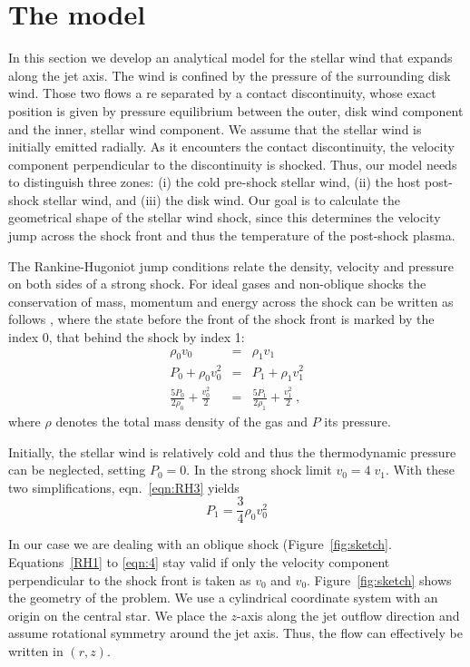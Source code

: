 \section{The model}

In this section we develop an analytical model for the stellar wind that expands along the jet axis. The wind is confined by the pressure of the surrounding disk wind. Those two flows a re separated by a contact discontinuity, whose exact position is given by pressure equilibrium between the outer, disk wind component and the inner, stellar wind component. We assume that the stellar wind is initially emitted radially. As it encounters the contact discontinuity, the velocity component perpendicular to the discontinuity is shocked. Thus, our model needs to distinguish three zones: (i) the cold pre-shock stellar wind, (ii) the host post-shock stellar wind, and (iii) the disk wind. Our goal is to calculate the geometrical shape of the stellar wind shock, since this determines the velocity jump across the shock front and thus the temperature of the post-shock plasma.

The Rankine-Hugoniot jump conditions relate the density, velocity and pressure on both sides of a strong shock. For ideal gases and non-oblique shocks the conservation of mass, momentum and energy across the shock can be written as follows \citep[][chap.~7, \S~15]{http://adsabs.harvard.edu/abs/1967pswh.book.....Z}, where the state before the front of the shock front is marked by the index 0, that behind the shock by index 1:
\begin{eqnarray}
\rho_0 v_0 &=& \rho_1 v_1 \label{eqn:RH1}\\
P_0+\rho_0 v_0^2 &=& P_1+\rho_1 v_1^2 \label{eqn:RH2}\\
\frac{5 P_0}{2\rho_0}+\frac{v_0^2}{2}&=&\frac{5 P_1}{2\rho_1}+\frac{v_1^2}{2} \ ,\label{eqNRH3}
\end{eqnarray}
where $\rho$ denotes the total mass density of the gas and $P$ its pressure. 

Initially, the stellar wind is relatively cold and thus the thermodynamic pressure can be neglected, setting $P_0=0$. In the strong shock limit $v_0=4\;v_1$. With these two simplifications, eqn.~\ref{eqn:RH3} yields
\begin{equation}
P_1 = \frac{3}{4} \rho_0 v_0^2 \label{eqn:4}
\end{equation}

In our case we are dealing with an oblique shock (Figure~\ref{fig:sketch}. Equations~\ref{RH1} to \ref{eqn:4} stay valid if only the velocity component perpendicular to the shock front is taken as $v_0$ and $v_0$. 
Figure~\ref{fig:sketch} shows the geometry of the problem. We use a cylindrical coordinate system with an origin on the central star. We place the $z$-axis along the jet outflow direction and assume rotational symmetry around the jet axis. Thus, the flow can effectively be written in $(r,z)$. 

